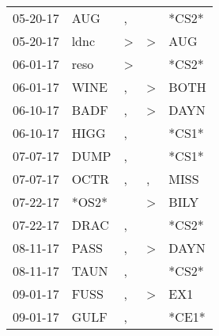 \begin{supertabular}{p{0.07\textwidth}p{0.06\textwidth}p{0.02\textwidth}p{0.02\textwidth}p{0.06\textwidth}}
          05-20-17\textsuperscript{} &            AUG\textsuperscript{} &                , &                  &                            *CS2* \\
          05-20-17\textsuperscript{} &           ldnc\textsuperscript{} &     \textgreater &     \textgreater &            AUG\textsuperscript{} \\
          06-01-17\textsuperscript{} &           reso\textsuperscript{} &     \textgreater &                  &                            *CS2* \\
          06-01-17\textsuperscript{} &           WINE\textsuperscript{} &                , &     \textgreater &           BOTH\textsuperscript{} \\
          06-10-17\textsuperscript{} &           BADF\textsuperscript{} &                , &     \textgreater &           DAYN\textsuperscript{} \\
          06-10-17\textsuperscript{} &           HIGG\textsuperscript{} &                , &                  &                            *CS1* \\
          07-07-17\textsuperscript{} &           DUMP\textsuperscript{} &                , &                  &                            *CS1* \\
          07-07-17\textsuperscript{} &           OCTR\textsuperscript{} &                , &                , &           MISS\textsuperscript{} \\
          07-22-17\textsuperscript{} &                            *OS2* &                  &     \textgreater &           BILY\textsuperscript{} \\
          07-22-17\textsuperscript{} &           DRAC\textsuperscript{} &                , &                  &                            *CS2* \\
          08-11-17\textsuperscript{} &           PASS\textsuperscript{} &                , &     \textgreater &           DAYN\textsuperscript{} \\
          08-11-17\textsuperscript{} &           TAUN\textsuperscript{} &                , &                  &                            *CS2* \\
          09-01-17\textsuperscript{} &           FUSS\textsuperscript{} &                , &     \textgreater &            EX1\textsuperscript{} \\
          09-01-17\textsuperscript{} &           GULF\textsuperscript{} &                , &                  &                            *CE1* \\

\end{supertabular}
